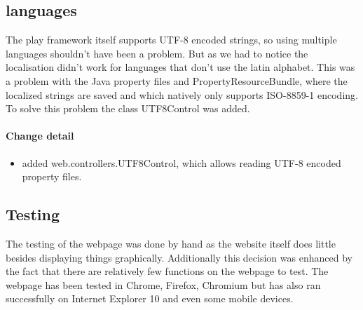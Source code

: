 \subsection{languages}
The play framework itself supports UTF-8 encoded strings, so using multiple languages shouldn't have been a problem. 
But as we had to notice the localisation didn't work for languages that don't use the latin alphabet.
This was a problem with the Java property files and PropertyResourceBundle, where the localized strings are saved and which natively only
supports ISO-8859-1 encoding.
To solve this problem the class UTF8Control was added.

\paragraph{Change detail}
\begin{itemize}
  \item added web.controllers.UTF8Control, which allows reading UTF-8 encoded property files.
\end{itemize}

\subsection{Testing}
The testing of the webpage was done by hand as the website itself does little besides displaying things graphically.
Additionally this decision was enhanced by the fact that there are relatively few functions on the webpage to test.
The webpage has been tested in Chrome, Firefox, Chromium but has also ran successfully on Internet Explorer 10 and even some mobile devices.
